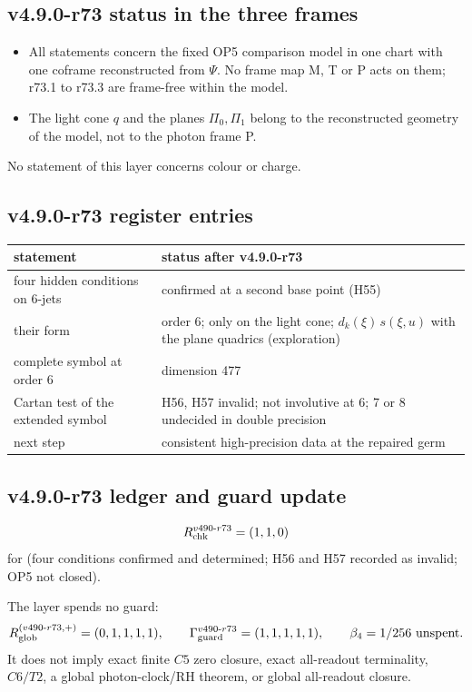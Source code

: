 \subsection*{v4.9.0-r73 status in the three frames}
\label{subsec:v490-r73-frames}

\begin{itemize}[leftmargin=2em]
\item All statements concern the fixed OP5 comparison model in one chart with one coframe reconstructed from \(\Psi\).  No frame
map M, T or P acts on them; r73.1 to r73.3 are frame-free within the model.
\item The light cone \(q\) and the planes \(\Pi_0,\Pi_1\) belong to the reconstructed geometry of the model, not to the photon
frame P.
\end{itemize}
No statement of this layer concerns colour or charge.

\subsection*{v4.9.0-r73 register entries}
\label{subsec:v490-r73-register}

\begin{center}
\small
\begin{tabular}{@{}>{\raggedright\arraybackslash}p{}>{\raggedright\arraybackslash}p{}@{}}
\toprule
statement & status after v4.9.0-r73\\
\midrule
four hidden conditions on 6-jets & confirmed at a second base point (H55)\\
their form & order 6; only on the light cone; \(d_k(\xi)\,s(\xi,u)\) with the plane quadrics (exploration)\\
complete symbol at order 6 & dimension 477\\
Cartan test of the extended symbol & H56, H57 invalid; not involutive at 6; 7 or 8 undecided in double precision\\
next step & consistent high-precision data at the repaired germ\\
\bottomrule
\end{tabular}
\end{center}

\subsection*{v4.9.0-r73 ledger and guard update}
\label{subsec:v490-r73-ledger-guard}

\[
R_{\rm chk}^{v490\text{-}r73}=(1,1,0)
\]
for (four conditions confirmed and determined; H56 and H57 recorded as invalid; OP5 not closed).

The layer spends no guard:
\[
R_{\rm glob}^{(v490\text{-}r73,+)}=(0,1,1,1,1),
\qquad
\Gamma_{\rm guard}^{v490\text{-}r73}=(1,1,1,1,1),
\qquad
\beta_4=1/256\ \text{unspent}.
\]
It does not imply exact finite \(C5\) zero closure, exact all-readout terminality,
\(C6/T2\), a global photon-clock/RH theorem, or global all-readout closure.
